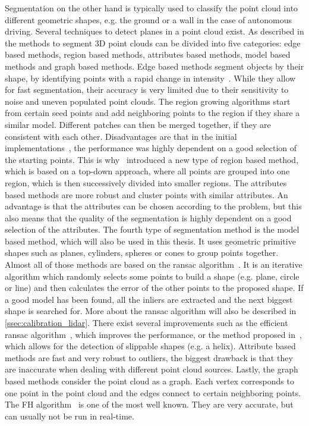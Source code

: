 Segmentation on the other hand is typically used to classify the point cloud into different geometric shapes, e.g. the ground or a wall in the case of autonomous driving.
Several techniques to detect planes in a point cloud exist.
As described in \cite{Nguyen2013} the methods to segment 3D point clouds can be divided into five categories: edge based methods, region based methods, attributes based methods, model based methods and graph based methods.
Edge based methods segment objects by their shape, by identifying points with a rapid change in intensity~\cite{Sappa2001}. While they allow for fast segmentation, their accuracy is very limited due to their sensitivity to noise and uneven populated point clouds.
The region growing algorithms start from certain seed points and add neighboring points to the region if they share a similar model.
Different patches can then be merged together, if they are consistent with each other.
Disadvantages are that in the initial implementations~\cite{Besl1988, Taubin1991}, the performance was highly dependent on a good selection of the starting points.
This is why~\cite{Chen2008} introduced a new type of region based method, which is based on a top-down approach, where all points are grouped into one region, which is then successively divided into smaller regions.
The attributes based methods are more robust and cluster points with similar attributes.
An advantage is that the attributes can be chosen according to the problem, but this also means that the quality of the segmentation is highly dependent on a good selection of the attributes.
The fourth type of segmentation method is the model based method, which will also be used in this thesis.
It uses geometric primitive shapes such as planes, cylinders, spheres or cones to group points together.
Almost all of those methods are based on the \gls{ransac} algorithm~\cite{Fischler1981}.
It is an iterative algorithm which randomly selects some points to build a shape (e.g. plane, circle or line) and then calculates the error of the other points to the proposed shape.
If a good model has been found, all the inliers are extracted and the next biggest shape is searched for.
More about the \gls{ransac} algorithm will also be described in \cref{ssec:calibration_lidar}.
There exist several improvements such as the efficient \gls{ransac} algorithm~\cite{Schnabel2007}, which improves the performance, or the method proposed in~\cite{li2011}, which allows for the detection of slippable shapes (e.g. a helix).
Attribute based methods are fast and very robust to outliers, the biggest drawback is that they are inaccurate when dealing with different point cloud sources.
Lastly, the graph based methods consider the point cloud as a graph.
Each vertex corresponds to one point in the point cloud and the edges connect to certain neighboring points.
The FH algorithm~\cite{Felzenszwalb2004} is one of the most well known.
They are very accurate, but can usually not be run in real-time.

